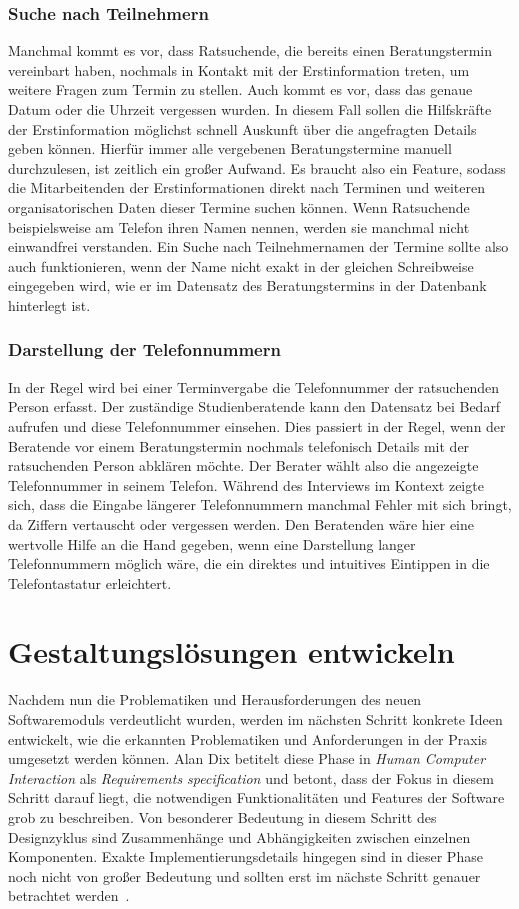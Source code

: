 \subsubsection{Suche nach Teilnehmern}
Manchmal kommt es vor, dass Ratsuchende, die bereits einen Beratungstermin
vereinbart haben, nochmals in Kontakt mit der Erstinformation treten, um
weitere Fragen zum Termin zu stellen. Auch kommt es vor, dass das genaue Datum
oder die Uhrzeit vergessen wurden. In diesem Fall sollen die Hilfskräfte der
Erstinformation möglichst schnell Auskunft über die angefragten Details geben
können. Hierfür immer alle vergebenen Beratungstermine manuell durchzulesen,
ist zeitlich ein großer Aufwand. Es braucht also ein Feature, sodass die
Mitarbeitenden der Erstinformationen direkt nach Terminen und weiteren
organisatorischen Daten dieser Termine suchen können. Wenn Ratsuchende
beispielsweise am Telefon ihren Namen nennen, werden sie manchmal nicht
einwandfrei verstanden. Ein Suche nach Teilnehmernamen der Termine sollte also
auch funktionieren, wenn der Name nicht exakt in der gleichen Schreibweise
eingegeben wird, wie er im Datensatz des Beratungstermins in der Datenbank
hinterlegt ist.

\subsubsection{Darstellung der Telefonnummern}
In der Regel wird bei einer Terminvergabe die Telefonnummer der ratsuchenden
Person erfasst. Der zuständige Studienberatende kann den Datensatz bei Bedarf
aufrufen und diese Telefonnummer einsehen. Dies passiert in der Regel, wenn der
Beratende vor einem Beratungstermin nochmals telefonisch Details mit der
ratsuchenden Person abklären möchte. Der Berater wählt also die angezeigte
Telefonnummer in seinem Telefon. Während des Interviews im Kontext zeigte sich,
dass die Eingabe längerer Telefonnummern manchmal Fehler mit sich bringt, da
Ziffern vertauscht oder vergessen werden. Den Beratenden wäre hier eine
wertvolle Hilfe an die Hand gegeben, wenn eine Darstellung langer
Telefonnummern möglich wäre, die ein direktes und intuitives Eintippen in die
Telefontastatur erleichtert.

\section{Gestaltungslösungen entwickeln}

Nachdem nun die Problematiken und Herausforderungen des neuen Softwaremoduls
verdeutlicht wurden, werden im nächsten Schritt konkrete Ideen entwickelt, wie
die erkannten Problematiken und Anforderungen in der Praxis umgesetzt werden
können. Alan Dix betitelt diese Phase in \textit{Human Computer Interaction}
als \textit{Requirements specification} und betont, dass der Fokus in diesem
Schritt darauf liegt, die notwendigen Funktionalitäten und Features der
Software grob zu beschreiben. Von besonderer Bedeutung in diesem Schritt des
Designzyklus sind Zusammenhänge und Abhängigkeiten zwischen einzelnen
Komponenten. Exakte Implementierungsdetails hingegen sind in dieser Phase noch
nicht von großer Bedeutung und sollten erst im nächste Schritt genauer
betrachtet werden~\cite{hci}.

